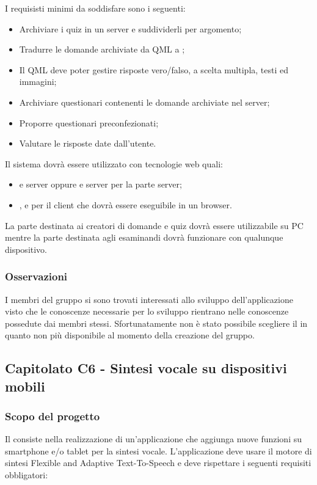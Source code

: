 I requisisti minimi da soddisfare sono i seguenti:
\begin{itemize}
	\item Archiviare i quiz in un server e suddividerli per argomento;
	\item Tradurre le domande archiviate da QML a ;
	\item Il QML deve poter gestire risposte vero/falso, a scelta multipla, testi ed immagini;
	\item Archiviare questionari contenenti le domande archiviate nel server;
	\item Proporre questionari preconfezionati;
	\item Valutare le risposte date dall'utente.
\end{itemize}

Il sistema dovrà essere utilizzato con tecnologie web quali:
\begin{itemize}
	\item {} e server  oppure  e server  per la parte server;
	\item {},  e  per il client che dovrà essere eseguibile in un browser.
\end{itemize}
La parte destinata ai creatori di domande e quiz dovrà essere utilizzabile su PC mentre la parte destinata agli esaminandi
dovrà funzionare con qualunque dispositivo.

\subsubsection{Osservazioni}
I membri del gruppo si sono trovati interessati allo sviluppo dell'applicazione visto che le conoscenze necessarie per lo sviluppo rientrano nelle conoscenze possedute dai membri stessi. Sfortunatamente non è stato possibile scegliere il  in quanto non più disponibile al momento della creazione del gruppo.

\subsection{Capitolato C6 - Sintesi vocale su dispositivi mobili}
\subsubsection{Scopo del progetto}
Il  consiste nella realizzazione di un'applicazione che aggiunga nuove funzioni su smartphone e/o tablet per la sintesi vocale.
L'applicazione deve usare il motore di sintesi Flexible and Adaptive Text-To-Speech e deve rispettare i seguenti requisiti obbligatori:

